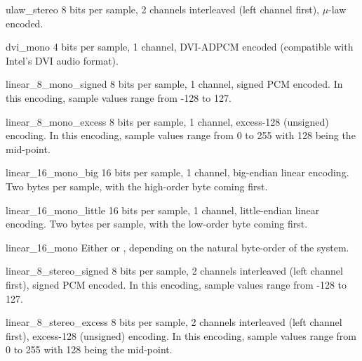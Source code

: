 \begin{datadesc}{ulaw_stereo}
8 bits per sample, 2 channels interleaved (left channel first),
$\mu$-law encoded.
\end{datadesc}

\begin{datadesc}{dvi_mono}
4 bits per sample, 1 channel, DVI-ADPCM encoded (compatible with
Intel's DVI audio format).
\end{datadesc}

\begin{datadesc}{linear_8_mono_signed}
8 bits per sample, 1 channel, signed PCM encoded.  In this encoding,
sample values range from -128 to 127.
\end{datadesc}

\begin{datadesc}{linear_8_mono_excess}
8 bits per sample, 1 channel, excess-128 (unsigned) encoding.  In this
encoding, sample values range from 0 to 255 with 128 being the
mid-point.
\end{datadesc}

\begin{datadesc}{linear_16_mono_big}
16 bits per sample, 1 channel, big-endian linear encoding.  Two bytes
per sample, with the high-order byte coming first.
\end{datadesc}

\begin{datadesc}{linear_16_mono_little}
16 bits per sample, 1 channel, little-endian linear encoding.  Two
bytes per sample, with the low-order byte coming first.
\end{datadesc}

\begin{datadesc}{linear_16_mono}
Either  or ,
depending on the natural byte-order of the system.
\end{datadesc}

\begin{datadesc}{linear_8_stereo_signed}
8 bits per sample, 2 channels interleaved (left channel first), signed
PCM encoded.  In this encoding, sample values range from -128 to 127.
\end{datadesc}

\begin{datadesc}{linear_8_stereo_excess}
8 bits per sample, 2 channels interleaved (left channel first),
excess-128 (unsigned) encoding.  In this encoding, sample values range
from 0 to 255 with 128 being the mid-point.
\end{datadesc}

